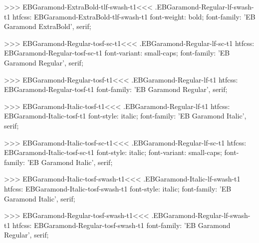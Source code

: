 {{{{{{{>>>
\<EBGaramond-ExtraBold-tlf-swash-t1\><<<
.EBGaramond-Regular-lf-swash-t1
htfcss:  EBGaramond-ExtraBold-tlf-swash-t1  font-weight: bold; font-family: 'EB Garamond ExtraBold', serif;

>>>
\<EBGaramond-Regular-tosf-sc-t1\><<<
.EBGaramond-Regular-lf-sc-t1
htfcss:  EBGaramond-Regular-tosf-sc-t1  font-variant: small-caps; font-family: 'EB Garamond Regular', serif;

>>>
\<EBGaramond-Regular-tosf-t1\><<<
.EBGaramond-Regular-lf-t1
htfcss:  EBGaramond-Regular-tosf-t1  font-family: 'EB Garamond Regular', serif;

>>>
\<EBGaramond-Italic-tosf-t1\><<<
.EBGaramond-Regular-lf-t1
htfcss:  EBGaramond-Italic-tosf-t1  font-style: italic; font-family: 'EB Garamond Italic', serif;

>>>
\<EBGaramond-Italic-tosf-sc-t1\><<<
.EBGaramond-Regular-lf-sc-t1
htfcss:  EBGaramond-Italic-tosf-sc-t1  font-style: italic; font-variant: small-caps; font-family: 'EB Garamond Italic', serif;

>>>
\<EBGaramond-Italic-tosf-swash-t1\><<<
.EBGaramond-Italic-lf-swash-t1
htfcss:  EBGaramond-Italic-tosf-swash-t1  font-style: italic; font-family: 'EB Garamond Italic', serif;

>>>
\<EBGaramond-Regular-tosf-swash-t1\><<<
.EBGaramond-Regular-lf-swash-t1
htfcss:  EBGaramond-Regular-tosf-swash-t1  font-family: 'EB Garamond Regular', serif;

}}}}}}}
